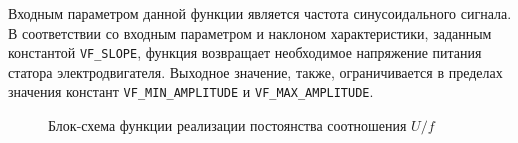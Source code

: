 %
%
%
%
        
        Входным параметром данной функции является частота синусоидального
        сигнала. В соответствии со входным параметром и наклоном
        характеристики, заданным константой \verb"VF_SLOPE", функция возвращает
        необходимое напряжение питания статора электродвигателя. Выходное
        значение, также, ограничивается в пределах значения констант
        \verb"VF_MIN_AMPLITUDE" и \verb"VF_MAX_AMPLITUDE".

        \begin{figure}[ph!]
            \caption{Блок-схема функции реализации постоянства соотношения $U/f$}
            \label{fig:bs-vf}
        \end{figure}
        

